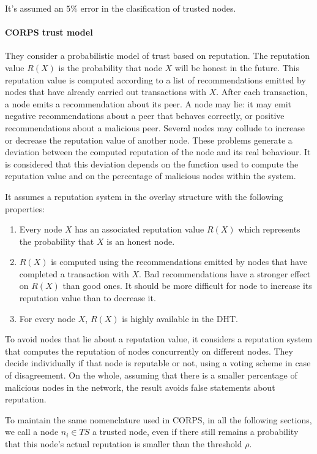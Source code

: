 It's assumed an $5\%$ error in the clasification of trusted nodes.


\paragraph{CORPS trust model}
\label{sec:corps}
They consider a probabilistic model of trust based on reputation.
The reputation value $R(X)$ is the probability that node $X$ will
be honest in the future. This reputation value is computed
according to a list of recommendations emitted by nodes that
have already carried out transactions with $X$.
After each transaction, a node emits a recommendation
about its peer. A node may lie: it may emit negative
recommendations about a peer that behaves correctly, or
positive recommendations about a malicious peer. Several nodes
may collude to increase or decrease the reputation value of
another node. These problems generate a deviation between
the computed reputation of the node and its real behaviour. It is
considered that this deviation depends on the function used to
compute the reputation value and on the percentage of malicious
nodes within the system.

It assumes a reputation system in the overlay structure with the following properties:
\begin{enumerate}
  \item Every node $X$ has an associated reputation value $R(X)$
  which represents the probability that $X$ is an honest node.
  \item $R(X)$ is computed using the recommendations emitted
  by nodes that have completed a transaction with $X$. Bad
  recommendations have a stronger effect on $R(X)$ than
  good ones. It should be more difficult for node to
  increase its reputation value than to decrease it.
  \item For every node $X$, $R(X)$ is highly available in the DHT.
\end{enumerate}

To avoid nodes that lie about a reputation value, it considers a reputation
system that computes the reputation of nodes concurrently on different nodes.
They decide individually if that node is reputable or not, using a voting
scheme in case of disagreement. On the whole, assuming that there is a smaller
percentage of malicious nodes in the network, the result avoids
false statements about reputation.

To maintain the same nomenclature used in CORPS, in all the following sections,
we call a node $n_i \in TS$ a trusted node, even if there still remains a
probability that this node's actual reputation is smaller than the threshold
$\rho$.
 
